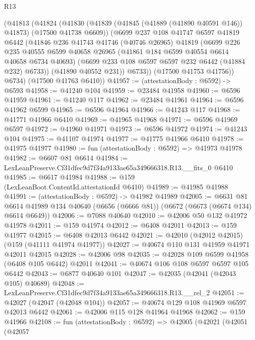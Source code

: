 \begin{lexlean}{R13}
\begin{coremodule}
      (@41813
        (@41824
          (@41830
            (@41839 (@41845 (@41889 (@41890 @40591 @146)) @41873) (@17500 @41738 @6609))
            (@6699
              @237
              @108
              @41747
              @6597
              @41819
              @6442
              (@41846
                @236
                @41743
                @41746
                (@40746 @26965)
                @41819
                (@6699
                  @226
                  @235
                  @40555
                  @6599
                  @40658
                  @26965
                  (@41861 @184 @6599 @40554 @6614 @40658 @6734 @40693)
                  (@6699 @233 @108 @6597 @6597 @232 @6442 (@41884 @232) @6733))
                (@41890 @40552 @231))
              @6733))
          (@17500 @41753 @41756))
        @6734)
      (@17500 @41763 @6410))
@41957 := (attestationBody : @6592) -> @6593
@41958 := @41240 @104
@41959 := @23484 @41958
@41960 := @6596 @41959
@41961 := @41240 @117
@41962 := @23484 @41961
@41964 := @6596 @41962 @6599
@41965 := @6596 @41964
@41966 := @41243 @117
@41968 := @41771 @41966 @6410
@41969 := @41965 @41968
@41971 := @6596 @41969 @6597
@41972 := @41960 @41971
@41973 := @6596 @41972
@41974 := @41243 @104
@41975 := @41107 @41974
@41977 := @41775 @41966 @6410
@41978 := @41975 @41977
@41980 := fun (attestationBody : @6592) => @41973 @41978
@41982 := @6607 @81 @6614
@41984 := LexLeanPreserve.Cf31dfec9d7f34a9133ae65a349666318.R13.__fits_0 @6410
@41985 := @6617 @41984
@41988 := @159 (LexLeanBoot.ContentId.attestationId @6410)
@41989 := @41985 @41988
@41991 := (attestationBody : @6592) -> @41982 @41989
@42005 := @6631
    @81
    @6614
    @41989
    @134
    @40640
    (@6656 (@6666 @81))
    (@6672 (@6673 (@6674 @134) @6614 @6649))
@42006 := @7088 @40640
@42010 := @42006 @50 @132 @41972 @41978
@42011 := @159 @41974
@42012 := @6408 @42011
@42013 := @159 @41977
@42015 := @6408 @42013 @6442
@42021 := @42010 (@42012 @42015) (@159 (@41111 @41974 @41977))
@42027 := @40674 @110 @131 @41959 @41971 @42011 @42015
@42028 := @42006 @98
@42035 := @42028 @109 @6599 @41958 (@6408 @105 @6442) @42011
@42041 := @40674 @106 @108 @6597 @6597 @105 @6442
@42043 := @6877 @40640 @101
@42047 := @42035 (@42041 (@42043 @105) @40689)
@42048 := LexLeanPreserve.Cf31dfec9d7f34a9133ae65a349666318.R13.__rel_2
@42051 := @42027 (@42047 (@42048 @104))
@42057 := @40674 @129 @108 @41969 @6597 @42013 @6442
@42061 := @42006 @115 @128 @41964 @41968
@42062 := @159 @41966
@42108 := fun (attestationBody : @6592) =>
  @42005
    (@42021
      (@42051
        (@42057

\end{coremodule}
\end{lexlean}
